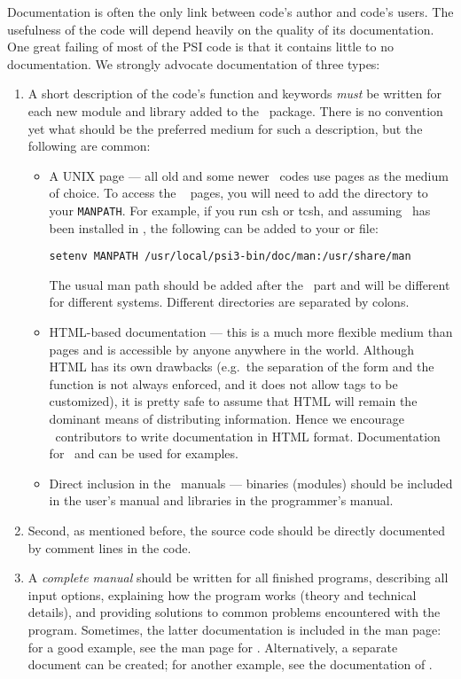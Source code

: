 Documentation is often the only link between code's author and code's
users. The usefulness of the code will depend heavily on the quality
of its documentation.  One great failing of most of the PSI code is
that it contains little to no documentation.  We strongly advocate
documentation of three types:
\begin{enumerate}
\item A short description of the code's function and keywords {\em must} be written
for each new module and library added to the \PSIthree\ package.
There is no convention yet what should be the preferred medium for
such a description, but the following are common:
\begin{itemize}
\item A UNIX  page --- all old and some newer \PSIthree\ codes
use  pages as the medium of choice.  To access the 
\PSIthree\  pages, you will need to add the  directory
to your {\tt MANPATH}.  For example, if you run csh or tcsh, and
assuming \PSIthree\ has been installed in ,
the following can be added to your  or  file:
\begin{verbatim}
setenv MANPATH /usr/local/psi3-bin/doc/man:/usr/share/man
\end{verbatim}
The usual man path should be added after the \PSIthree\ part and
will be different for different systems.  Different directories are
separated by colons.

\item HTML-based documentation --- this is a much more flexible medium
than  pages and is accessible by anyone anywhere in the
world.  Although HTML has its own drawbacks (e.g.\ the separation of the
form and the function is not always enforced, and it does not allow
tags to be customized), it is pretty safe to assume that HTML will
remain the dominant means of distributing information.  Hence we
encourage \PSIthree\ contributors to write documentation in HTML
format. Documentation for \PSIcints\ and  can be
used for examples.

\item Direct inclusion in the \PSIthree\ manuals --- binaries
(modules) should be included in the user's manual and libraries in the
programmer's manual.
\end{itemize}

\item Second, as mentioned before, the source code should be directly
documented by comment lines in the code.

\item A {\em complete manual} should be written for all finished programs,
describing all input options, explaining how the program works (theory and 
technical details), and providing solutions to common problems encountered
with the program.  Sometimes, the latter documentation is included in the
man page: for a good example, see the man page for .  
Alternatively, a separate document can be created; for another example,
see the documentation of .
\end{enumerate}
